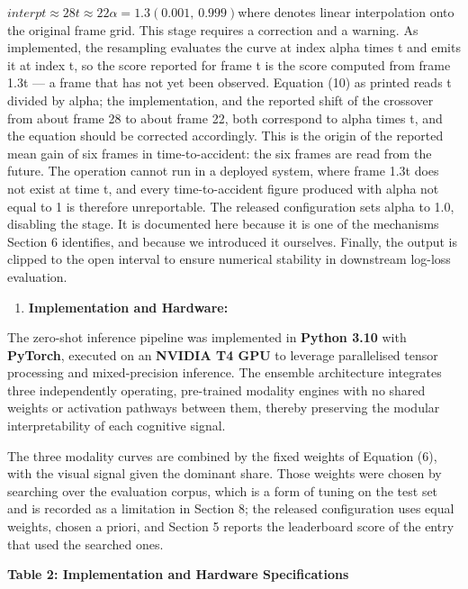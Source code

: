 \(interpt \approx 28t \approx 22\alpha = 1.3\left( 0.001,\text{ }0.999 \right)\)where denotes linear interpolation onto the original frame grid. This stage requires a correction and a warning. As implemented, the resampling evaluates the curve at index alpha times t and emits it at index t, so the score reported for frame t is the score computed from frame 1.3t --- a frame that has not yet been observed. Equation (10) as printed reads t divided by alpha; the implementation, and the reported shift of the crossover from about frame 28 to about frame 22, both correspond to alpha times t, and the equation should be corrected accordingly. This is the origin of the reported mean gain of six frames in time-to-accident: the six frames are read from the future. The operation cannot run in a deployed system, where frame 1.3t does not exist at time t, and every time-to-accident figure produced with alpha not equal to 1 is therefore unreportable. The released configuration sets alpha to 1.0, disabling the stage. It is documented here because it is one of the mechanisms Section 6 identifies, and because we introduced it ourselves. Finally, the output is clipped to the open interval to ensure numerical stability in downstream log-loss evaluation.

\begin{enumerate}
\def\labelenumi{\arabic{enumi}.}
\item
  \textbf{Implementation and Hardware:}
\end{enumerate}

The zero-shot inference pipeline was implemented in \textbf{Python 3.10} with \textbf{PyTorch}, executed on an \textbf{NVIDIA T4 GPU} to leverage parallelised tensor processing and mixed-precision inference. The ensemble architecture integrates three independently operating, pre-trained modality engines with no shared weights or activation pathways between them, thereby preserving the modular interpretability of each cognitive signal.

The three modality curves are combined by the fixed weights of Equation (6), with the visual signal given the dominant share. Those weights were chosen by searching over the evaluation corpus, which is a form of tuning on the test set and is recorded as a limitation in Section 8; the released configuration uses equal weights, chosen a priori, and Section 5 reports the leaderboard score of the entry that used the searched ones.

\textbf{Table 2: Implementation and Hardware Specifications}

